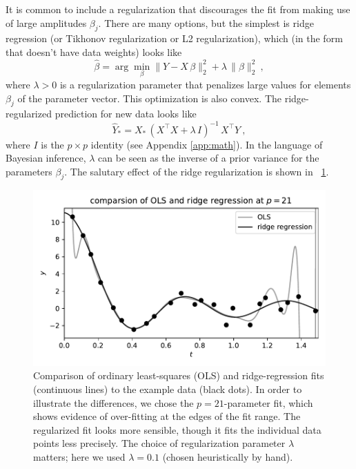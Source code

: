 \documentclass[12pt,letterpaper]{article}
\newlength{\figurewidth}
\begin{document}
It is common to include a regularization that discourages the fit from making use of large amplitudes $\beta_j$.
There are many options, but the simplest is ridge regression (or Tikhonov regularization or L2 regularization), which (in the form that doesn't have data weights) looks like
\begin{equation} \label{eq:ridge}
    \hat{\beta} = \arg\min_\beta \|Y - X\,\beta\|_2^2 + \lambda\,\|\beta\|_2^2
    ~,
\end{equation}
where $\lambda>0$ is a regularization parameter that penalizes large values for elements $\beta_j$ of the parameter vector.
This optimization is also convex.
The ridge-regularized prediction for new data looks like
\begin{equation} \label{eq:ridge_sol}
    \hat{Y}_\ast = X_\ast\,(X^\top X + \lambda\,I)^{-1}\,X^\top Y
    ~,
\end{equation}
where $I$ is the $p\times p$ identity (see Appendix \ref{app:math}).
In the language of Bayesian inference, $\lambda$ can be seen as the inverse of a prior variance for the parameters $\beta_j$.
The salutary effect of the ridge regularization is shown in \figurename~\ref{fig:ridge}.
\begin{figure}[t]
    \begin{mdframed}
    \includegraphics[width=\figurewidth]{paper/ridge.pdf}
    \caption{Comparison of ordinary least-squares (OLS) and ridge-regression fits (continuous lines) to the example data (black dots). In order to illustrate the differences, we chose the $p=21$-parameter fit, which shows evidence of over-fitting at the edges of the fit range. The regularized fit looks more sensible, though it fits the individual data points less precisely. The choice of regularization parameter $\lambda$ matters; here we used $\lambda=0.1$ (chosen heuristically by hand).}
    \label{fig:ridge}
    \end{mdframed}
\end{figure}
\end{document}
